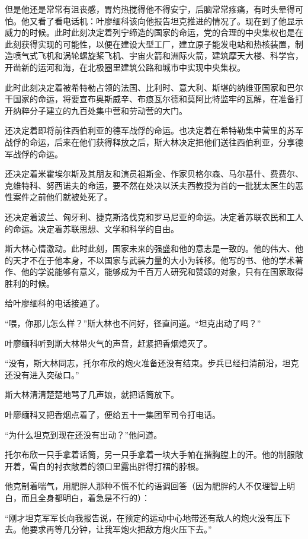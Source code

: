 但是他还是常常有沮丧感，胃灼热搅得他不得安宁，后脑常常疼痛，有时头晕得可怕。他又看了看电话机：叶廖缅科该向他报告坦克推进的情况了。现在到了他显示威力的时候。此时此刻决定着列宁缔造的国家的命运，党的合理的中央集权也是在此刻获得实现的可能性，以便在建设大型工厂，建立原子能发电站和热核装置，制造喷气式飞机和涡轮螺旋桨飞机、宇宙火箭和洲际火箭，建筑摩天大楼、科学宫，开凿新的运河和海，在北极圈里建筑公路和城市中实现中央集权。

此时此刻决定着被希特勒占领的法国、比利时、意大利、斯堪的纳维亚国家和巴尔干国家的命运，将要宣布奥斯威辛、布痕瓦尔德和莫阿比特监牢的瓦解，在准备打开纳粹分子建立的九百处集中营和劳动营的大门。

还决定着即将前往西伯利亚的德军战俘的命运。也决定着在希特勒集中营里的苏军战俘的命运，后来在他们获得释放之后，斯大林决定把他们送往西伯利亚，分享德军战俘的命运。

还决定着米霍埃尔斯及其朋友和演员祖斯金、作家贝格尔森、马尔基什、费费尔、克维特科、努西诺夫的命运，要不然在处决以沃夫西教授为首的一批犹太医生的恶性案件之前他们就被处死了。

还决定着波兰、匈牙利、捷克斯洛伐克和罗马尼亚的命运。决定着苏联农民和工人的命运。决定着苏联思想、文学和科学的自由。

斯大林心情激动。此时此刻，国家未来的强盛和他的意志是一致的。他的伟大、他的天才不在于他本身，不以国家与武装力量的大小为转移。他写的书、他的学术著作、他的学说能够有意义，能够成为千百万人研究和赞颂的对象，只有在国家取得胜利的时候。

给叶廖缅科的电话接通了。

“喂，你那儿怎么样？”斯大林也不问好，径直问道。“坦克出动了吗？”

叶廖缅科听到斯大林带火气的声音，赶紧把香烟熄灭了。

“没有，斯大林同志，托尔布欣的炮火准备还没有结束。步兵已经扫清前沿，坦克还没有进入突破口。”

斯大林清清楚楚地骂了几声娘，就把话筒放下。

叶廖缅科又把香烟点着了，便给五十一集团军司令打电话。

“为什么坦克到现在还没有出动？”他问道。

托尔布欣一只手拿着话筒，另一只手拿着一块大手帕在揩胸膛上的汗。他的制服敞开着，雪白的衬衣敞着的领口里露出胖得打褶的脖根。

他克制着喘气，用肥胖人那种不慌不忙的语调回答（因为肥胖的人不仅理智上明白，而且全身都明白，着急是不行的）：

“刚才坦克军军长向我报告说，在预定的运动中心地带还有敌人的炮火没有压下去。他要求再等几分钟，让我军炮火把敌方炮火压下去。”

